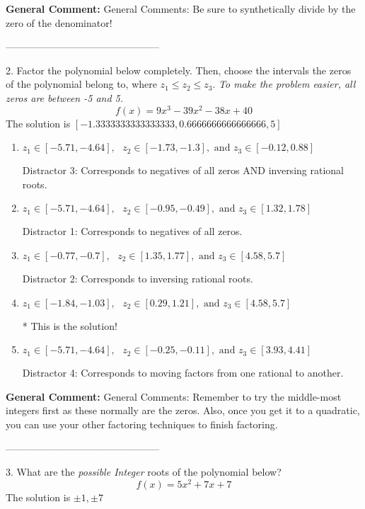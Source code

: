 \documentclass{extbook}[14pt]
\begin{document}
\textbf{General Comment:} General Comments: Be sure to synthetically divide by the zero of the denominator! 

-----------------------------------------------

2. Factor the polynomial below completely. Then, choose the intervals the zeros of the polynomial belong to, where $z_1 \leq z_2 \leq z_3$. \textit{To make the problem easier, all zeros are between -5 and 5.}
\[ f(x) = 9x^{3} -39 x^{2} -38 x + 40 \] 
The solution is $ [-1.3333333333333333, 0.6666666666666666, 5] $ 

\begin{enumerate}[label=\Alph*.] 
\item $ z_1 \in [-5.71, -4.64], \text{   }  z_2 \in [-1.73, -1.3], \text{   and   } z_3 \in [-0.12, 0.88] $ 

  Distractor 3: Corresponds to negatives of all zeros AND inversing rational roots. 
\item $ z_1 \in [-5.71, -4.64], \text{   }  z_2 \in [-0.95, -0.49], \text{   and   } z_3 \in [1.32, 1.78] $ 

  Distractor 1: Corresponds to negatives of all zeros. 
\item $ z_1 \in [-0.77, -0.7], \text{   }  z_2 \in [1.35, 1.77], \text{   and   } z_3 \in [4.58, 5.7] $ 

  Distractor 2: Corresponds to inversing rational roots. 
\item $ z_1 \in [-1.84, -1.03], \text{   }  z_2 \in [0.29, 1.21], \text{   and   } z_3 \in [4.58, 5.7] $ 

 * This is the solution! 
\item $ z_1 \in [-5.71, -4.64], \text{   }  z_2 \in [-0.25, -0.11], \text{   and   } z_3 \in [3.93, 4.41] $ 

  Distractor 4: Corresponds to moving factors from one rational to another. 
\end{enumerate} 
 
\textbf{General Comment:} General Comments: Remember to try the middle-most integers first as these normally are the zeros. Also, once you get it to a quadratic, you can use your other factoring techniques to finish factoring. 

-----------------------------------------------

3. What are the \textit{possible Integer} roots of the polynomial below?
\[ f(x) = 5x^{2} +7 x + 7 \] 
The solution is $ \pm 1,\pm 7 $ 
\end{document}
